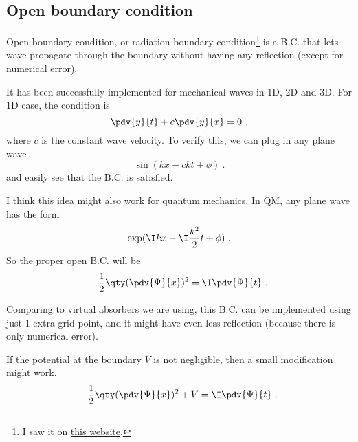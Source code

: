 
\begin{issues}
\issueDraft
\end{issues}



\subsection{Open boundary condition}

Open boundary condition, or radiation boundary condition\footnote{I saw it on \href{http://hplgit.github.io/num-methods-for-PDEs/doc/pub/wave/sphinx/._main_wave003.html#problem-11-implement-open-boundary-conditions}{this website}.} is a B.C. that lets wave propagate through the boundary without having any reflection (except for numerical error).

It has been successfully implemented for mechanical waves in 1D, 2D and 3D. For 1D case, the condition is
\begin{equation}
\pdv{y}{t} + c\pdv{y}{x} = 0~,
\end{equation}
where $c$ is the constant wave velocity. To verify this, we can plug in any plane wave
\begin{equation}
\sin(kx - ckt + \phi)~.
\end{equation}
and easily see that the B.C. is satisfied.

I think this idea might also work for quantum mechanics. In QM, any plane wave has the form
\begin{equation}
\exp(\I kx - \I \frac{k^2}{2}t + \phi)~,
\end{equation}
So the proper open B.C. will be
\begin{equation}
-\frac12 \qty(\pdv{\Psi}{x})^2 = \I \pdv{\Psi}{t}~.
\end{equation}

Comparing to virtual absorbers we are using, this B.C. can be implemented using just 1 extra grid point, and it might have even less reflection (because there is only numerical error).

If the potential at the boundary $V$ is not negligible, then a small modification might work.
\begin{equation}
-\frac12 \qty(\pdv{\Psi}{x})^2 + V = \I \pdv{\Psi}{t}~.
\end{equation}
